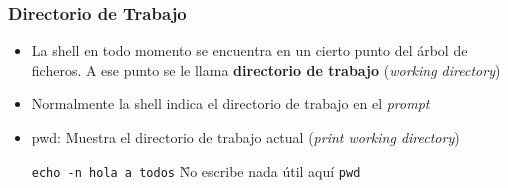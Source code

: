 \documentclass[ucs]{beamer}
\begin{document}

\begin{frame}[fragile]
  \frametitle{Directorio de Trabajo}

  \begin{itemize}
  \item La shell en todo momento se encuentra en un cierto punto del
    árbol de ficheros. A ese punto se le llama \textbf{directorio de trabajo}
 (\emph{working directory})
  \item Normalmente la shell indica el directorio de trabajo en el \emph{prompt}
  \item pwd: Muestra el directorio de trabajo actual
    (\emph{print working directory})
    \begin{footnotesize}
      \begin{tabbing}
        \verb|echo -n hola a todos|\hspace{1cm} \= No escribe nada útil aquí\kill
        \verb|pwd| \> \\
      \end{tabbing}
    \end{footnotesize}
  \end{itemize}

\end{frame}

\end{document}
